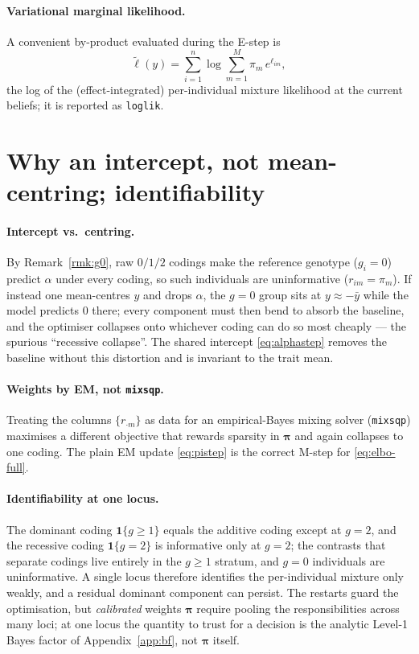 \documentclass[11pt]{article}
\theoremstyle{plain}
\theoremstyle{remark}
\begin{document}
\paragraph{Variational marginal likelihood.} A convenient by-product evaluated
during the E-step is
\begin{equation}\label{eq:loglik}
  \widetilde{\ell}(y)
  =\sum_{i=1}^{n}\log\sum_{m=1}^{M}\pi_m\,e^{\ell_{im}},
\end{equation}
the log of the (effect-integrated) per-individual mixture likelihood at the
current beliefs; it is reported as \texttt{loglik}.

\section{Why an intercept, not mean-centring; identifiability}
\label{sec:intercept}

\paragraph{Intercept vs.\ centring.} By Remark~\ref{rmk:g0}, raw $0/1/2$ codings
make the reference genotype ($g_i=0$) predict $\alpha$ under every coding, so such
individuals are uninformative ($r_{im}=\pi_m$). If instead one mean-centres $y$
and drops $\alpha$, the $g=0$ group sits at $y\approx-\bar y$ while the model
predicts $0$ there; every component must then bend to absorb the baseline, and
the optimiser collapses onto whichever coding can do so most cheaply --- the
spurious ``recessive collapse''. The shared intercept \eqref{eq:alphastep}
removes the baseline without this distortion and is invariant to the trait mean.

\paragraph{Weights by EM, not \texttt{mixsqp}.} Treating the columns
$\{r_{\cdot m}\}$ as data for an empirical-Bayes mixing solver
(\texttt{mixsqp}) maximises a different objective that rewards sparsity in
$\bm\pi$ and again collapses to one coding. The plain EM update
\eqref{eq:pistep} is the correct M-step for \eqref{eq:elbo-full}.

\paragraph{Identifiability at one locus.} The dominant coding
$\mathbf 1\{g\ge1\}$ equals the additive coding except at $g=2$, and the
recessive coding $\mathbf 1\{g=2\}$ is informative only at $g=2$; the
contrasts that separate codings live entirely in the $g\ge 1$ stratum, and
$g=0$ individuals are uninformative. A single locus therefore identifies the
per-individual mixture only weakly, and a residual dominant component can
persist. The restarts guard the optimisation, but \emph{calibrated} weights
$\bm\pi$ require pooling the responsibilities across many loci; at one locus the
quantity to trust for a decision is the analytic Level-1 Bayes factor of
Appendix~\ref{app:bf}, not $\bm\pi$ itself.
\end{document}
